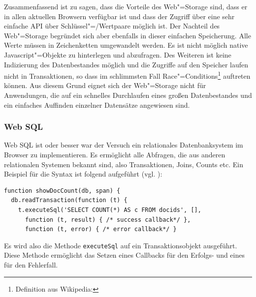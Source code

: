 Zusammenfassend ist zu sagen, dass die Vorteile des Web"=Storage sind, dass er in allen aktuellen Browsern verfügbar ist und dass der Zugriff über eine sehr einfache API über Schlüssel"=/Wertpaare möglich ist. Der Nachteil des Web"=Storage begründet sich aber ebenfalls in dieser einfachen Speicherung. Alle Werte müssen in Zeichenketten umgewandelt werden. Es ist nicht möglich native Javascript"=Objekte zu hinterlegen und abzufragen. Des Weiteren ist keine Indizierung des Datenbestandes möglich und die Zugriffe auf den Speicher laufen nicht in Transaktionen, so dass im schlimmsten Fall Race"=Conditions\footnote{Definition aus Wikipedia: } auftreten können. Aus diesem Grund eignet sich der Web"=Storage nicht für Anwendungen, die auf ein schnelles Durchlaufen eines großen Datenbestandes und ein einfaches Auffinden einzelner Datensätze angewiesen sind.

\subsubsection*{Web SQL}
Web SQL ist oder besser war der Versuch ein relationales Datenbanksystem im Browser zu implementieren. Es ermöglicht alle Abfragen, die aus anderen relationalen Systemen bekannt sind, also Transaktionen, Joins, Counts etc. Ein Beispiel für die Syntax ist folgend aufgeführt (vgl. \cite{W3C2010}):
\begin{lstlisting}
function showDocCount(db, span) {
  db.readTransaction(function (t) {
    t.executeSql('SELECT COUNT(*) AS c FROM docids', [], 
      function (t, result) { /* success callback*/ }, 
      function (t, error) { /* error callback*/ }
\end{lstlisting}
Es wird also die Methode \texttt{executeSql} auf ein Transaktionsobjekt ausgeführt. Diese Methode ermöglicht das Setzen eines Callbacks für den Erfolgs- und eines für den Fehlerfall. 

